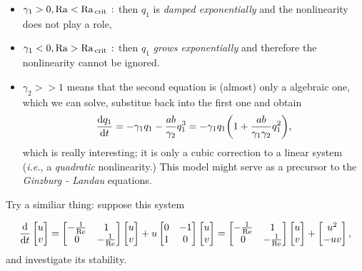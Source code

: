 \documentclass[reqno, a4paper]{article}
\begin{document}
\begin{itemize}
	\item $\gamma_1>0, \mathrm{Ra} < \mathrm{Ra}_{\, \text{crit} \,}:$ then $q_1$ is \textit{damped exponentially} and the nonlinearity does not play a role,
	\item $\gamma_1<0, \mathrm{Ra} > \mathrm{Ra}_{\, \text{crit} \,}:$ then $q_1$ \textit{grows exponentially} and therefore the nonlinearity cannot be ignored.
	\item $\gamma_2 >>1$ means that the second equation is (almost) only a algebraic one, which we can solve, substitue back into the first one and obtain
		\[
			\dv{q_1}{t} = -\gamma_1 q_1 - \frac{ab}{\gamma_2}q_1^{3} = -\gamma_1 q_1\qty(1+\frac{ab}{\gamma_1\gamma_2}q_1^{2}),
		\]
		which is really interesting; it is only a cubic correction to a linear system (\textit{i.e.}, a \textit{quadratic} nonlinearity.) This model might serve as a precursor to the \textit{Ginzburg - Landau} equations.
\end{itemize}

Try a similiar thing: suppose this system

\[
	\dv{t} \begin{bmatrix}
		u \\
		v	
	\end{bmatrix}
	=  \begin{bmatrix}
		- \frac{1}{\mathrm{Re}} & 1 \\
		0 & - \frac{1}{\mathrm{Re}}
	\end{bmatrix}
	\begin{bmatrix}
		u \\
		v
	\end{bmatrix}
	+ u
	\begin{bmatrix}
		0 & -1 \\
		1 & 0 
	\end{bmatrix}
	\begin{bmatrix}
	  u \\
	  v
	\end{bmatrix}
	=  \begin{bmatrix}
		- \frac{1}{\mathrm{Re}} & 1 \\
		0 & - \frac{1}{\mathrm{Re}}
	\end{bmatrix}
	\begin{bmatrix}
		u \\
		v
	\end{bmatrix}
	+ \begin{bmatrix}
	u^{2} \\
	- uv
	\end{bmatrix},
\]
and investigate its stability.
\end{document}
